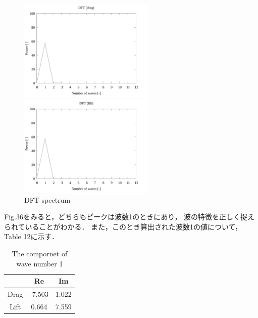 \begin{figure}
  \begin{minipage}[b]{0.45\linewidth}
    \centering
    \includegraphics[width=65mm]{../../02_workspace/result/2-ex/plot/07/07-3_dft-drag.png}
  \end{minipage}
  \begin{minipage}[b]{0.45\linewidth}
    \centering
    \includegraphics[width=65mm]{../../02_workspace/result/2-ex/plot/07/07-4_dft-lift.png}
  \end{minipage}
  \caption{DFT spectrum}
\end{figure}

Fig.36をみると，どちらもピークは波数1のときにあり，
波の特徴を正しく捉えられていることがわかる．
また，このとき算出された波数1の値について，Table 12に示す．

\begin{table}[htbp]
  \begin{center}
    \caption{The compornet of wave number 1}
    \begin{tabular}{|p{30mm}|p{20mm}|p{20mm}|}
      \hline
      \multicolumn{1}{|c|}{}     & \multicolumn{1}{|c|}{Re}     & \multicolumn{1}{|c|}{Im}    \\ \hline
      \multicolumn{1}{|c|}{Drag} & \multicolumn{1}{|c|}{-7.503} & \multicolumn{1}{|c|}{1.022} \\ \hline
      \multicolumn{1}{|c|}{Lift} & \multicolumn{1}{|c|}{0.664}  & \multicolumn{1}{|c|}{7.559} \\ \hline
    \end{tabular}
  \end{center}
\end{table}

